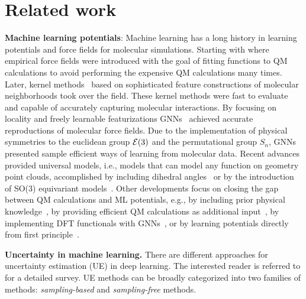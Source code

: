 \section{Related work}\label{sec:related}

\textbf{Machine learning potentials}:
Machine learning has a long history in learning potentials and force fields for molecular simulations. Starting with \citet{halgrenMerckMolecularForce1996} where empirical force fields were introduced with the goal of fitting functions to QM calculations to avoid performing the expensive QM calculations many times.
Later, kernel methods~\citep{behlerAtomcenteredSymmetryFunctions2011,bartokRepresentingChemicalEnvironments2013,christensenFCHLRevisitedFaster2020} based on sophisticated feature constructions of molecular neighborhoods took over the field.
These kernel methods were fast to evaluate and capable of accurately capturing molecular interactions.
By focusing on locality and freely learnable featurizations GNNs~\citep{schuttSchNetDeepLearning2018,unkePhysNetNeuralNetwork2019} achieved accurate reproductions of molecular force fields.
Due to the implementation of physical symmetries to the euclidean group $\mathcal{E}(3)$ and the permutational group $S_n$, GNNs presented sample efficient ways of learning from molecular data.
Recent advances provided universal models, i.e., models that can model any function on geometry point clouds, accomplished by including dihedral angles~\citep{gasteigerGemNetUniversalDirectional2021,liuSphericalMessagePassing2021} or by the introduction of SO(3) equivariant models~\citep{thomasTensorFieldNetworks2018,batznerEquivariantGraphNeural2022}.
Other developments focus on closing the gap between QM calculations and ML potentials, e.g., by including prior physical knowledge~\citep{unkeSpookyNetLearningForce2021}, by providing efficient QM calculations as additional input~\citep{qiaoOrbNetDeepLearning2020,qiaoUNiTEUnitaryNbody2021}, by implementing DFT functionals with GNNs~\citep{snyderFindingDensityFunctionals2012,kirkpatrickPushingFrontiersDensity2021}, or by learning potentials directly from first principle~\citep{gaoAbInitioPotentialEnergy2022,gaoGeneralizing2023,gaoSamplingfreeInferenceAbInitio2022}.

\textbf{Uncertainty in machine learning.} There are different approaches for uncertainty estimation (UE) in deep learning. The interested reader is referred to \citet{gawlikowski2021survey} for a detailed survey. UE methods can be broadly categorized into two families of methods: \emph{sampling-based} and \emph{sampling-free} methods. 

